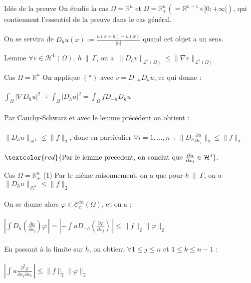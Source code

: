\documentclass[10pt]{beamer}
\begin{document}
\begin{frame}{Idée de la preuve}
On étudie la cas $\Omega=\mathbb{R}^n$ et  $\Omega=\mathbb{R}^n_+(=\mathbb{R}^{n-1}\times ]0;+\infty[)$, qui contiennent l'essentiel de la preuve dans le cas général. \\ ~ \\ 

On se servira de $\displaystyle D_hu(x):=\frac{u(x+h)-u(x)}{|h|}$ quand cet objet a un sens.

\end{frame}


\begin{frame}{Lemme}
$\forall v \in \mathcal{H}^1(\Omega), \ h \ \| \ \Gamma$, on a $\ \|D_hv\|_{\mathcal{L}^2(\Omega)} \leq \|\nabla v\|_{\mathcal{L}^2(\Omega)}  $

\end{frame}



\begin{frame}{Cas $\Omega=\mathbb{R}^n$}
On applique $(*)$ avec $v=D_{-h}D_hu$, ce qui donne  : \\~\\

$ \displaystyle \int_{\Omega} |\nabla D_h u|^2 \,  + \int_{\Omega} |D_hu|^2 =  \int_{\Omega} f D_{-h}D_hu  \,$ \\~\\

Par Cauchy-Schwarz et avec le lemme précédent on obtient : \\~\\ 

$\|D_hu\|_{\mathcal{H}^1} \leq \|f\|_2$, donc en particulier  $\forall i=1,\dots,n \ $ : $\displaystyle \|D_h \frac{\partial u}{\partial x_i} \|_2 \leq \|f\|_2$  \\~\\

$\textcolor{red}{\text{Par le lemme precedent, on conclut que } \frac{\partial u}{\partial x_i} \in \mathcal{H}^1}.$
\end{frame}


\begin{frame}{Cas $\Omega=\mathbb{R}^n_+$ (1)}
Par le même raisonnement, on a que pour $h \ \| \ \Gamma$, on a $\|D_hu\|_{\mathcal{H}^1} \leq \|f\|_2  $ \\~\\
On se donne alors $\varphi \in \mathcal{C}^\infty_c(\Omega)$, et on a : \\~\\

$\displaystyle \left | \int D_h (\frac{\partial u}{\partial x_j} )\varphi \, \right | =  \left |-\int uD_{-h} (\frac{\partial \varphi}{\partial x_j})\, \right | \leq \|f\|_2 \|\varphi\|_2 $ \\~\\

En passant à la limite sur $h$, on obtient $\forall 1\leq j \leq n$ et $1 \leq k \leq n-1$ : \\~\\

$\left |\displaystyle \int u \frac{\partial^2 \varphi}{\partial x_j \partial x_k} \, \right | \leq \|f\|_2 \|\varphi\|_2 $
\end{frame}
\end{document}
